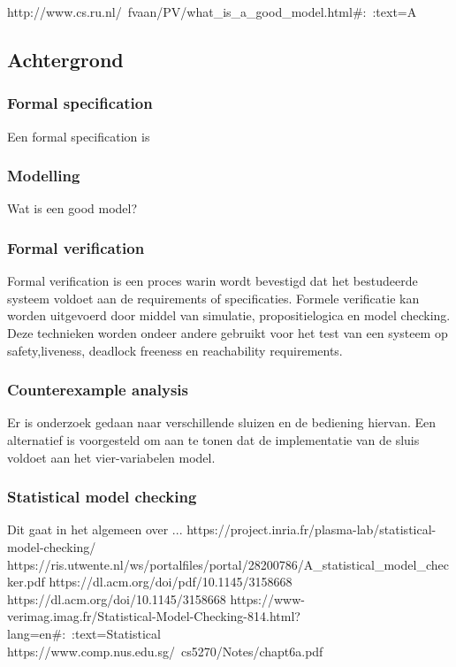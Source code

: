 \documentclass{article}
\begin{document}
	http://www.cs.ru.nl/~fvaan/PV/what_is_a_good_model.html#:~:text=A%
	
	\subsection{Achtergrond}
	
	\subsubsection{Formal specification}
	Een formal specification is
	\subsubsection{Modelling}
	Wat is een good model?
	\subsubsection{Formal verification}
	Formal verification is een proces warin wordt bevestigd dat het bestudeerde systeem voldoet aan de requirements of specificaties. Formele verificatie kan worden uitgevoerd door middel van simulatie, propositielogica en model checking. Deze technieken worden ondeer andere gebruikt voor het test van een systeem op safety,liveness, deadlock freeness en reachability requirements.
	
	\subsubsection{Counterexample analysis}
	Er is onderzoek gedaan naar verschillende sluizen en de bediening hiervan. 
	Een alternatief is voorgesteld om aan te tonen dat de implementatie van de sluis voldoet aan het vier-variabelen model.
	
	\subsubsection{Statistical model checking}
	Dit gaat in het algemeen over ...
	https://project.inria.fr/plasma-lab/statistical-model-checking/
	https://ris.utwente.nl/ws/portalfiles/portal/28200786/A_statistical_model_checker.pdf
	https://dl.acm.org/doi/pdf/10.1145/3158668
	https://dl.acm.org/doi/10.1145/3158668
	https://www-verimag.imag.fr/Statistical-Model-Checking-814.html?lang=en#:~:text=Statistical%
	https://www.comp.nus.edu.sg/~cs5270/Notes/chapt6a.pdf
\end{document}
